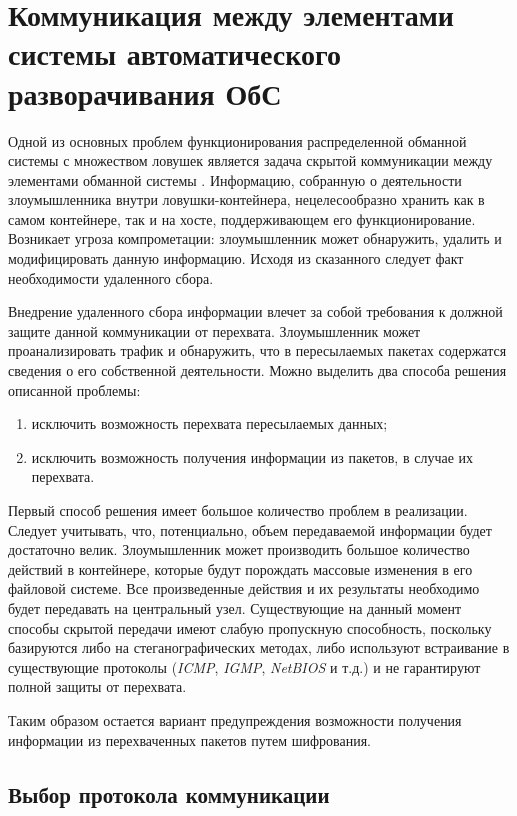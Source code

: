 \section{Коммуникация между элементами системы автоматического разворачивания ОбС}

Одной из основных проблем функционирования распределенной обманной системы с множеством ловушек является задача скрытой коммуникации между элементами обманной системы \citep{Peskova2014}. Информацию, собранную о деятельности злоумышленника внутри ловушки-контейнера, нецелесообразно хранить как в самом контейнере, так и на хосте, поддерживающем его функционирование. Возникает угроза компрометации: злоумышленник может обнаружить, удалить и модифицировать данную информацию. Исходя из сказанного следует факт необходимости удаленного сбора. 

Внедрение удаленного сбора информации влечет за собой требования к должной защите данной коммуникации от перехвата. Злоумышленник может проанализировать трафик и обнаружить, что в пересылаемых пакетах содержатся сведения о его собственной деятельности. Можно выделить два способа решения описанной проблемы:
\begin{enumerate}
	\item исключить возможность перехвата пересылаемых данных;
	\item исключить возможность получения информации из пакетов, в случае их перехвата.
\end{enumerate}

Первый способ решения имеет большое количество проблем в реализации. Следует учитывать, что, потенциально, объем передаваемой информации будет достаточно велик. Злоумышленник может производить большое количество действий в контейнере, которые будут порождать массовые изменения в его файловой системе. Все произведенные действия и их результаты необходимо будет передавать на центральный узел. Существующие на данный момент способы скрытой передачи имеют слабую пропускную способность, поскольку базируются либо на стеганографических методах, либо используют встраивание в существующие протоколы (\textit{ICMP}, \textit{IGMP}, \textit{NetBIOS} и т.д.) и не гарантируют полной защиты от перехвата.

Таким образом остается вариант предупреждения возможности получения информации из перехваченных пакетов путем шифрования.

\subsection{Выбор протокола коммуникации}


